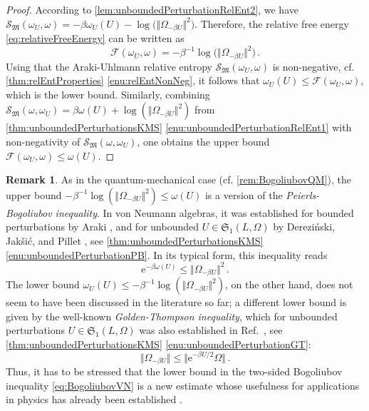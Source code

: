 \documentclass[a4paper, twoside, 11pt, reqno]{amsart}
\theoremstyle{definition}
\newtheorem{remark}[definition]{Remark}
\theoremstyle{plain}
\renewcommand{\Omega}{\varOmega}
\newcommand{\MF}{\mathcal{F}}
\newcommand{\MS}{\mathcal{S}}
\newcommand{\MFM}{\mathfrak{M}}
\newcommand{\MFS}{\mathfrak{S}}
\newcommand{\ee}{\mathrm{e}}
\newcommand{\1}{\mathbf{1}}
\newcommand{\norm}[2][]{#1\Vert{#2}#1\Vert}
\newcommand{\inv}[1]{#1^{-1}}
\begin{document}
\begin{proof}
    According to \cref{lem:unboundedPerturbationRelEnt2}, we have $\MS_\MFM(\omega_U, \omega) = - \beta \omega_U(U) - \log\bigl(\norm{\Omega_{- \beta U}}^2\bigr)$. Therefore, the relative free energy \eqref{eq:relativeFreeEnergy} can be written as
    \begin{equation}\label{eq:perturbedVectorRFE}
        \MF(\omega_U, \omega) = - \inv{\beta} \log\bigl(\norm{\Omega_{- \beta U}}^2\bigr) \, .
    \end{equation}
    Using that the Araki-Uhlmann relative entropy $\MS_\MFM(\omega_U, \omega)$ is non-negative, cf. \cref{thm:relEntProperties} \ref{enu:relEntNonNeg}, it follows that $\omega_U(U) \le \MF(\omega_U, \omega)$, which is the lower bound. Similarly, combining $\MS_\MFM(\omega, \omega_U) = \beta \omega(U) + \log (\norm{\Omega_{- \beta U}}^2)$ from \cref{thm:unboundedPerturbationsKMS} \ref{enu:unboundedPerturbationRelEnt1} with non-negativity of $\MS_\MFM(\omega, \omega_U)$, one obtains the upper bound $\MF(\omega_U, \omega) \le \omega(U)$.
\end{proof}

\begin{remark}     
    As in the quantum-mechanical case (cf. \cref{rem:BogoliubovQM}), the upper bound $- \inv{\beta} \log (\norm{\Omega_{- \beta U}}^2) \le \omega(U)$ is a version of the \emph{Peierls-Bogoliubov inequality}. In von Neumann algebras, it was established for bounded perturbations by Araki \cite[Thm. 1]{Araki1973b}, and for unbounded $U \in \MFS_1(L, \Omega)$ by Derezi\'{n}ski, Jak\v{s}i\'{c}, and Pillet \cite[Thm. 5.5 (8)]{DJP03}, see \cref{thm:unboundedPerturbationsKMS} \ref{enu:unboundedPerturbationPB}. In its typical form, this inequality reads
    \begin{equation*}
        \ee^{- \beta \omega(U)} \le \norm{\Omega_{- \beta U}}^2 \, .
    \end{equation*}
    The lower bound $\omega_U(U) \le - \inv{\beta} \log (\norm{\Omega_{- \beta U}}^2)$, on the other hand, does not seem to have been discussed in the literature so far; a different lower bound is given by the well-known \emph{Golden-Thompson inequality}, which for unbounded perturbations $U \in \MFS_1(L, \Omega)$ was also established in Ref.~\cite[Thm. 5.5 (9)]{DJP03}, see \cref{thm:unboundedPerturbationsKMS} \ref{enu:unboundedPerturbationGT}:
    \begin{equation*}
        \norm{\Omega_{- \beta U}} \le \norm{\ee^{- \beta U / 2} \Omega} \, .
    \end{equation*}
    Thus, it has to be stressed that the lower bound in the two-sided Bogoliubov inequality \eqref{eq:BogoliubovVN} is a new estimate whose usefulness for applications in physics has already been established \cite{Reible2022, Reible2025apx, Reible2023, Reible2025camcos}.
\end{remark}
\end{document}
